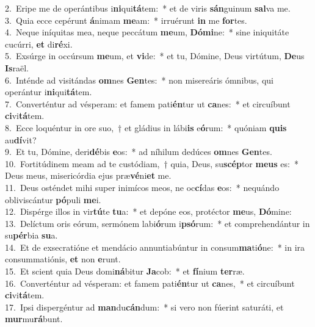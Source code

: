 {2.~}Eripe me de operántibus i\textbf{ni}qui\textbf{tá}tem:~* et de viris \textbf{sán}guinum \textbf{sal}va me.\\
{3.~}Quia ecce cepérunt \textbf{á}nimam \textbf{me}am:~* irruérunt \textbf{in} me \textbf{for}tes.\\
{4.~}Neque iníquitas mea, neque peccátum \textbf{me}um, \textbf{Dó}\textbf{mi}ne:~* sine iniquitáte cucúrri, \textbf{et} di\textbf{ré}xi.\\
{5.~}Exsúrge in occúrsum \textbf{me}um, et \textbf{vi}de:~* et tu, Dómine, Deus virtútum, \textbf{De}us \textbf{Is}raël.\\
{6.~}Inténde ad visitándas \textbf{om}nes \textbf{Gen}tes:~* non misereáris ómnibus, qui operántur i\textbf{ni}qui\textbf{tá}tem.\\
{7.~}Converténtur ad vésperam: et famem pati\textbf{én}tur ut \textbf{ca}nes:~* et circuíbunt \textbf{ci}vi\textbf{tá}tem.\\
{8.~}Ecce loquéntur in ore suo,~† et gládius in lábi\textbf{is} e\textbf{ó}rum:~* quóniam \textbf{quis} au\textbf{dí}vit?\\
{9.~}Et tu, Dómine, deri\textbf{dé}bis \textbf{e}os:~* ad níhilum dedúces \textbf{om}nes \textbf{Gen}tes.\\
{10.~}Fortitúdinem meam ad te custódiam,~† quia, Deus, su\textbf{scép}tor \textbf{me}\textbf{us} es:~* Deus meus, misericórdia ejus præ\textbf{vé}ni\textbf{et} me.\\
{11.~}Deus osténdet mihi super inimícos meos, ne oc\textbf{cí}das \textbf{e}os:~* nequándo obliviscántur \textbf{pó}puli \textbf{me}i.\\
{12.~}Dispérge illos in vir\textbf{tú}te \textbf{tu}a:~* et depóne eos, protéctor \textbf{me}us, \textbf{Dó}mine:\\
{13.~}Delíctum oris eórum, sermónem labi\textbf{ó}rum i\textbf{psó}rum:~* et comprehendántur in su\textbf{pér}bia \textbf{su}a.\\
{14.~}Et de exsecratióne et mendácio annuntiabúntur in consum\textbf{ma}ti\textbf{ó}ne:~* in ira consummatiónis, \textbf{et} non \textbf{e}runt.\\
{15.~}Et scient quia Deus domi\textbf{ná}bitur \textbf{Ja}cob:~* et \textbf{fí}nium \textbf{ter}ræ.\\
{16.~}Converténtur ad vésperam: et famem pati\textbf{én}tur ut \textbf{ca}nes,~* et circuíbunt \textbf{ci}vi\textbf{tá}tem.\\
{17.~}Ipsi dispergéntur ad \textbf{man}du\textbf{cán}dum:~* si vero non fúerint saturáti, et \textbf{mur}mu\textbf{rá}bunt.\\
